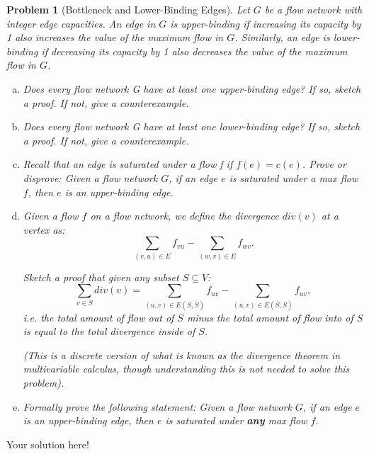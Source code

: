 \documentclass[10pt]{article}
\newtheorem{problem}{\sc\color{cit}Problem}
\begin{document}
\begin{problem}[Bottleneck and Lower-Binding Edges]
Let $G$ be a flow network with integer edge capacities. An edge in $G$ is upper-binding if increasing its capacity by 1 also increases the value of the maximum flow in $G$. Similarly, an edge is lower-binding if decreasing its capacity by 1 also decreases the value of the maximum flow in $G$.
\begin{enumerate}[(a)]
    \item Does every flow network G have at least one upper-binding edge? If so, sketch a proof. If not, give a counterexample.
    \item Does every flow network G have at least one lower-binding edge? If so, sketch a proof. If not, give a counterexample.
    \item Recall that an edge is saturated under a flow f if $f(e) = c(e)$. Prove or disprove: Given a flow network $G$, if an edge $e$ is saturated under a max flow $f$, then $e$ is an upper-binding edge.
    \item Given a flow $f$ on a flow network, we define the divergence $div(v)$ at a vertex as:
    \[
        \sum_{(v,u)\in E} f_{vu} - \sum_{(w,v) \in E} f_{wv}.
    \]
    
    Sketch a proof that given any subset $S \subseteq V$:
    \[
        \sum_{v \in S} div(v) = \sum_{(u,v) \in E(S,\overline{S})} f_{uv} - \sum_{(u,v) \in E(\overline{S},S)} f_{uv},
    \]
    i.e. the total amount of flow out of $S$ minus the total amount of flow into of $S$ is equal to the total divergence inside of $S$.
    
    
    (This is a discrete version of what is known as the divergence theorem in multivariable calculus, though understanding this is not needed to solve this problem).
    \item Formally prove the following statement: Given a flow network $G$, if an edge $e$ is an upper-binding edge, then $e$ is saturated under \textbf{any} max flow $f$.
\end{enumerate}
\end{problem}

\begin{solution}
Your solution here!
\end{solution}

\newpage


\end{document}

